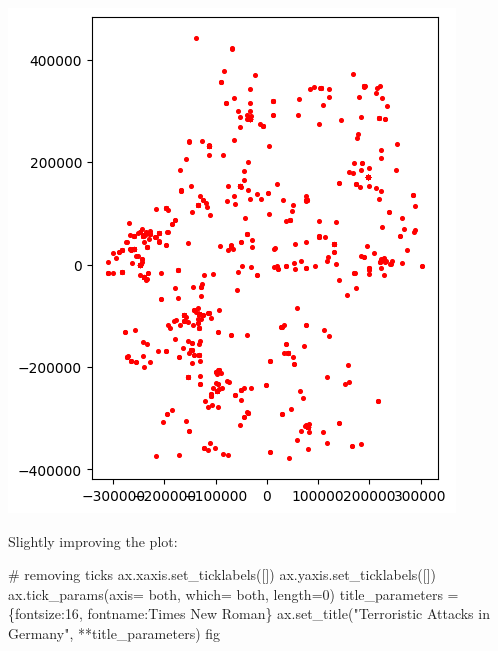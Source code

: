 \documentclass[
  letterpaper,
  DIV=11,
  numbers=noendperiod]{scrreprt}
\newenvironment{Shaded}{\begin{snugshade}}{\end{snugshade}}
\newcommand{\CommentTok}[1]{\textcolor[rgb]{0.37,0.37,0.37}{#1}}
\newcommand{\DecValTok}[1]{\textcolor[rgb]{0.68,0.00,0.00}{#1}}
\newcommand{\NormalTok}[1]{\textcolor[rgb]{0.00,0.23,0.31}{#1}}
\newcommand{\OperatorTok}[1]{\textcolor[rgb]{0.37,0.37,0.37}{#1}}
\newcommand{\StringTok}[1]{\textcolor[rgb]{0.13,0.47,0.30}{#1}}
\begin{document}
\includegraphics{labs/w02_maps_files/figure-pdf/cell-5-output-1.png}

Slightly improving the plot:

\begin{Shaded}
\begin{Highlighting}[]
\CommentTok{\# removing ticks}
\NormalTok{ax.xaxis.set\_ticklabels([])}
\NormalTok{ax.yaxis.set\_ticklabels([])}
\NormalTok{ax.tick\_params(axis}\OperatorTok{=} \StringTok{\textquotesingle{}both\textquotesingle{}}\NormalTok{, which}\OperatorTok{=} \StringTok{\textquotesingle{}both\textquotesingle{}}\NormalTok{, length}\OperatorTok{=}\DecValTok{0}\NormalTok{)}
\NormalTok{title\_parameters }\OperatorTok{=}\NormalTok{ \{}\StringTok{\textquotesingle{}fontsize\textquotesingle{}}\NormalTok{:}\StringTok{\textquotesingle{}16\textquotesingle{}}\NormalTok{, }\StringTok{\textquotesingle{}fontname\textquotesingle{}}\NormalTok{:}\StringTok{\textquotesingle{}Times New Roman\textquotesingle{}}\NormalTok{\}}
\NormalTok{ax.set\_title(}\StringTok{"Terroristic Attacks in Germany"}\NormalTok{, }\OperatorTok{**}\NormalTok{title\_parameters)}
\NormalTok{fig}
\end{Highlighting}
\end{Shaded}
\end{document}
